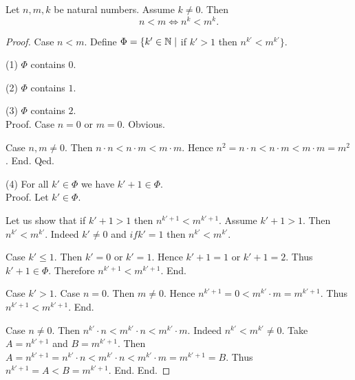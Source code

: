 \documentclass[../arithmetic.tex]{subfiles}
\begin{document}
  \begin{forthel}
    \begin{proposition}
      Let $n, m, k$ be natural numbers.
      Assume $k \neq 0$.
      Then \[ n < m \iff n^{k} < m^{k}. \]
    \end{proposition}
    \begin{proof}
      Case $n < m$.
        Define $\Phi = \{ k' \in \mathbb{N} \mid$ if $k' > 1$ then
        $n^{k'} < m^{k'} \}$.

        (1) $\Phi$ contains $0$.

        (2) $\Phi$ contains $1$.

        (3) $\Phi$ contains $2$. \\
        Proof.
          Case $n = 0$ or $m = 0$. Obvious.

          Case $n, m \neq 0$.
            Then $n \cdot n
              < n \cdot m
              < m \cdot m$.
            Hence $n^{2}
              = n \cdot n
              < n \cdot m
              < m \cdot m
              = m^{2}$.
          End.
        Qed.

        (4) For all $k' \in \Phi$ we have $k' + 1 \in \Phi$. \\
        Proof.
          Let $k' \in \Phi$.

          Let us show that if $k' + 1 > 1$ then
          $n^{k' + 1} < m^{k' + 1}$.
            Assume $k' + 1 > 1$.
            Then $n^{k'} < m^{k'}$.
            Indeed $k' \neq 0$ and $if k' = 1$ then $n^{k'} < m^{k'}$.

            Case $k' \leq 1$.
              Then $k' = 0$ or $k' = 1$.
              Hence $k' + 1 = 1$ or $k' + 1 = 2$.
              Thus $k' + 1 \in \Phi$.
              Therefore $n^{k' + 1} < m^{k' + 1}$.
            End.

            Case $k' > 1$.
              Case $n = 0$.
                Then $m \neq 0$.
                Hence $n^{k' + 1}
                  = 0
                  < m^{k'} \cdot m
                  = m^{k' + 1}$.
                Thus $n^{k' + 1} < m^{k' + 1}$.
              End.

              Case $n \neq 0$.
                Then $n^{k'} \cdot n
                  < m^{k'} \cdot n
                  < m^{k'} \cdot m$.
                Indeed $n^{k'} < m^{k'} \neq 0$.
                Take $A = n^{k' + 1}$ and $B = m^{k' + 1}$. %
                Then $A
                  = n^{k' + 1}
                  = n^{k'} \cdot n
                  < m^{k'} \cdot n
                  < m^{k'} \cdot m
                  = m^{k' + 1}
                  = B$.
                Thus $n^{k' + 1} = A < B = m^{k' + 1}$.
              End.
            End.


\end{proof}
\end{forthel}
\end{document}
